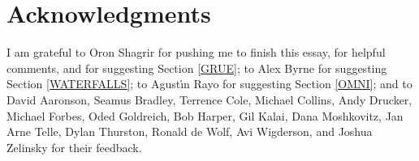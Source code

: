 \documentclass[12pt,onecolumn]{article}%
\begin{document}
\section{Acknowledgments}

I am grateful to Oron Shagrir for pushing me to finish this essay, for helpful
comments, and for suggesting Section \ref{GRUE}; to Alex Byrne for suggesting
Section \ref{WATERFALLS}; to Agust\'{\i}n Rayo for suggesting Section
\ref{OMNI}; and to David Aaronson, Seamus Bradley, Terrence Cole, Michael
Collins, Andy Drucker, Michael Forbes, Oded Goldreich, Bob Harper, Gil Kalai,
Dana Moshkovitz, Jan Arne Telle, Dylan Thurston, Ronald de Wolf, Avi
Wigderson, and Joshua Zelinsky for their feedback.



\end{document}
